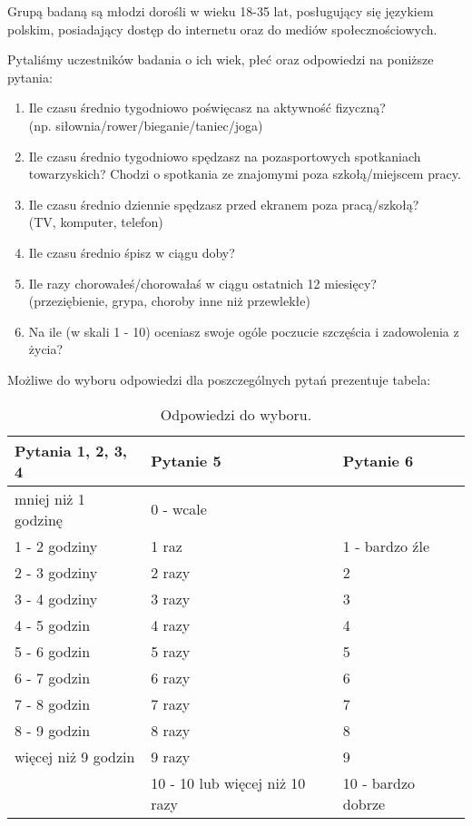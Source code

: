 \documentclass[12pt,a4paper]{article}
\begin{document}
Grupą badaną są młodzi dorośli w wieku 18-35 lat, posługujący się językiem polskim, posiadający dostęp do internetu oraz do mediów społecznościowych.

Pytaliśmy uczestników badania o ich wiek, płeć oraz odpowiedzi na poniższe pytania:
\begin{enumerate}
    \item {Ile czasu średnio tygodniowo poświęcasz na aktywność fizyczną? \\ (np. siłownia/rower/bieganie/taniec/joga)}
    \item Ile czasu średnio tygodniowo spędzasz na pozasportowych spotkaniach towarzyskich? Chodzi o spotkania ze znajomymi poza szkołą/miejscem pracy.
    \item {Ile czasu średnio dziennie spędzasz przed ekranem poza pracą/szkołą? \\ 
    (TV, komputer, telefon)}
    \item Ile czasu średnio śpisz w ciągu doby?
    \item {Ile razy chorowałeś/chorowałaś w ciągu ostatnich 12 miesięcy? \\
    (przeziębienie, grypa, choroby inne niż przewlekłe)}
    \item Na ile (w skali 1 - 10) oceniasz swoje ogóle poczucie szczęścia i zadowolenia z życia?
\end{enumerate}
\vspace{4mm}

Możliwe do wyboru odpowiedzi dla poszczególnych pytań prezentuje tabela:
\begin{table}[h]
    \centering
    \begin{tabular}{|l|l|l|}
        \hline \textbf{Pytania 1, 2, 3, 4} & \textbf{Pytanie 5} & \textbf{Pytanie 6} \\ \hline 
        mniej niż 1 godzinę & 0 - wcale &\\ \hline
        1 - 2 godziny & 1 raz & 1 - bardzo źle \\ \hline
        2 - 3 godziny & 2 razy & 2 \\ \hline
        3 - 4 godziny & 3 razy & 3 \\ \hline
        4 - 5 godzin & 4 razy & 4 \\ \hline
        5 - 6 godzin & 5 razy & 5 \\ \hline
        6 - 7 godzin & 6 razy & 6 \\ \hline
        7 - 8 godzin & 7 razy & 7 \\ \hline
        8 - 9 godzin & 8 razy & 8 \\ \hline
        więcej niż 9 godzin & 9 razy & 9 \\ \hline
         & 10 - 10 lub więcej niż 10 razy & 10 - bardzo dobrze \\ \hline
    \end{tabular}
    \caption{Odpowiedzi do wyboru.}
\end{table}
\end{document}
